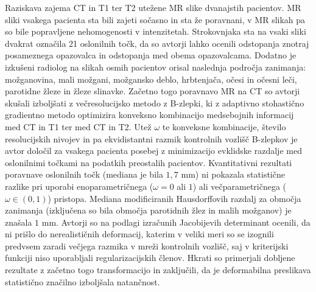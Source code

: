 \documentclass[journal]{IEEEtran}
\begin{document}
Raziskava \cite{fortunati2014} zajema CT in T1 ter T2 utežene MR slike dvanajstih pacientov. MR sliki vsakega pacienta sta bili zajeti sočasno in sta že poravnani, v MR slikah pa so bile popravljene nehomogenosti v intenzitetah. Strokovnjaka sta na vsaki sliki dvakrat označila 21 oslonilnih točk, da so avtorji lahko ocenili odstopanja znotraj posameznega opazovalca in odstopanja med obema opazovalcama. Dodatno je izkušeni radiolog na slikah osmih pacientov orisal naslednja področja zanimanja: možganovina, mali možgani, možgansko deblo, hrbtenjača, očesi in očesni leči, parotidne žleze in žleze slinavke. Začetno togo poravnavo MR na CT so avtorji skušali izboljšati z večresolucijsko metodo z B-zlepki, ki z adaptivno stohastično gradientno metodo optimizira konveksno kombinacijo medsebojnih informacij med CT in T1 ter med CT in T2. Utež $\omega$ te konveksne kombinacije, število resolucijskih nivojev in pa ekvidistantni razmik kontrolnih vozlišč B-zlepkov je avtor določil za vsakega pacienta posebej z minimizacijo evklidske razdalje med oslonilnimi točkami na podatkih preostalih pacientov. Kvantitativni rezultati poravnave oslonilnih točk (mediana je bila $1{,}7$ mm) ni pokazala statistične razlike pri uporabi enoparametričnega ($\omega = 0$ ali $1$) ali večparametričnega ($\omega\in(0,1)$) pristopa. Mediana modificiranih Hausdorffovih razdalj za območja zanimanja (izključena so bila območja parotidnih žlez in malih možganov) je znašala $1$ mm. Avtorji so na podlagi izračunih Jacobijevih determinant ocenili, da ni prišlo do nerealističnih deformacij, katerim v veliki meri so se izognili predvsem zaradi večjega razmika v mreži kontrolnih vozlišč, saj v kriterijski funkciji niso uporabljali regularizacijskih členov. Hkrati so primerjali dobljene rezultate z začetno togo transformacijo in zaključili, da je deformabilna preslikava statistično značilno izboljšala natančnost.
\end{document}
